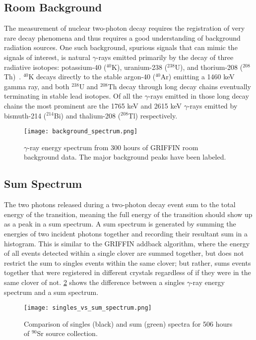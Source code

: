 \documentclass[cnatzke_thesis_proposal.tex]{subfiles}
\begin{document}
\subsection{Room Background}
\label{sec:room_background}
The measurement of nuclear two-photon decay requires the registration of very rare decay phenomena and thus requires a good understanding of background radiation sources. 
One such background, spurious signals that can mimic the signals of interest, is natural $\gamma$-rays emitted primarily by the decay of three radiative isotopes: potassium-40 ($^{40}$K), uranium-238 ($^{238}$U), and thorium-208 ($^{208}$Th)~\cite[]{aksoy_elemental_1994}.
$^{40}$K decays directly to the stable argon-40 ($^{40}$Ar) emitting a 1460 keV gamma ray, and both $^{238}$U and $^{208}$Th decay through long decay chains eventually terminating in stable lead isotopes. 
Of all the $\gamma$-rays emitted in those long decay chains the most prominent are the 1765 keV and 2615 keV $\gamma$-rays emitted by bismuth-214 ($^{214}$Bi) and thalium-208 ($^{208}$Tl) respectively.

\begin{figure}[htbp]
  \centering
  \texttt{[image: background\_spectrum.png]}
  \caption{$\gamma$-ray energy spectrum from 300 hours of GRIFFIN room background data. The major background peaks have been labeled.}
  \label{fig:background_spectrum}
\end{figure}

\subsection{Sum Spectrum}
\label{sec:sum_spectrum}

The two photons released during a two-photon decay event sum to the total energy of the transition, meaning the full energy of the transition should show up as a peak in a sum spectrum. 
A sum spectrum is generated by summing the energies of two incident photons together and recording their resultant sum in a histogram.
This is similar to the GRIFFIN addback algorithm, where the energy of all events detected within a single clover are summed together, but does not restrict the sum to singles events within the same clover; but rather, sums events together that were registered in different crystals regardless of if they were in the same clover of not. 
\ref{fig:singles_vs_sum_spectrum} shows the difference between a singles $\gamma$-ray energy spectrum and a sum spectrum.

\begin{figure}[htbp]
  \centering
  \texttt{[image: singles\_vs\_sum\_spectrum.png]}
  \caption{Comparison of singles (black) and sum (green) spectra for 506 hours of $^{90}$Sr source collection.}
  \label{fig:singles_vs_sum_spectrum}
\end{figure}


\end{document}
